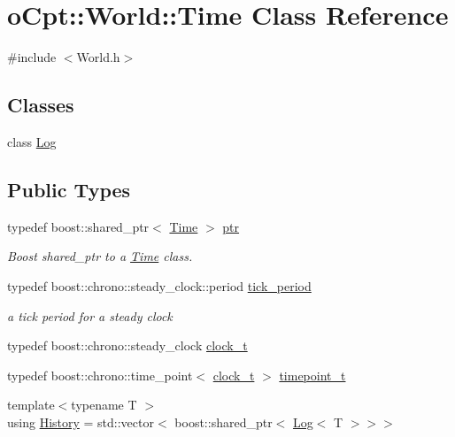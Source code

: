 \hypertarget{classo_cpt_1_1_world_1_1_time}{}\section{o\+Cpt\+:\+:World\+:\+:Time Class Reference}
\label{classo_cpt_1_1_world_1_1_time}


{\ttfamily \#include $<$World.\+h$>$}

\subsection*{Classes}
\begin{DoxyCompactItemize}
\item 
class \hyperlink{classo_cpt_1_1_world_1_1_time_1_1_log}{Log}
\end{DoxyCompactItemize}
\subsection*{Public Types}
\begin{DoxyCompactItemize}
\item 
typedef boost\+::shared\+\_\+ptr$<$ \hyperlink{classo_cpt_1_1_world_1_1_time}{Time} $>$ \hyperlink{classo_cpt_1_1_world_1_1_time_ae99716d20374e14ec5053765a9921ef2}{ptr}
\begin{DoxyCompactList}\small\item\em Boost shared\+\_\+ptr to a \hyperlink{classo_cpt_1_1_world_1_1_time}{Time} class. \end{DoxyCompactList}\item 
typedef boost\+::chrono\+::steady\+\_\+clock\+::period \hyperlink{classo_cpt_1_1_world_1_1_time_a8191b46c075d8d9ec6db0588797b59a5}{tick\+\_\+period}
\begin{DoxyCompactList}\small\item\em a tick period for a steady clock \end{DoxyCompactList}\item 
typedef boost\+::chrono\+::steady\+\_\+clock \hyperlink{classo_cpt_1_1_world_1_1_time_ac41de01610f32d0ace4844ed3bf454f7}{clock\+\_\+t}
\item 
typedef boost\+::chrono\+::time\+\_\+point$<$ \hyperlink{classo_cpt_1_1_world_1_1_time_ac41de01610f32d0ace4844ed3bf454f7}{clock\+\_\+t} $>$ \hyperlink{classo_cpt_1_1_world_1_1_time_a6a6e782c3c90622c1c7070b0a223ec4c}{timepoint\+\_\+t}
\item 
{\footnotesize template$<$typename T $>$ }\\using \hyperlink{classo_cpt_1_1_world_1_1_time_a7c51955f1bccc0f26b8a3d35599b6135}{History} = std\+::vector$<$ boost\+::shared\+\_\+ptr$<$ \hyperlink{classo_cpt_1_1_world_1_1_time_1_1_log}{Log}$<$ T $>$$>$$>$
\end{DoxyCompactItemize}
